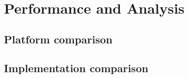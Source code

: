 \chapter{Performance and Analysis}
\renewcommand{\baselinestretch}{\mystretch}
\label{chap:Perf}

\section{Platform comparison}

\section{Implementation comparison}

